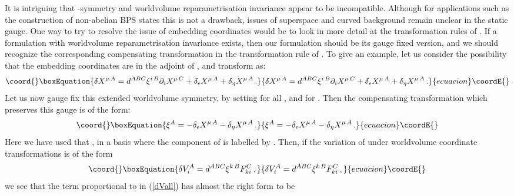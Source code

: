 \documentclass[12pt,a4paper]{article}
\begin{document}
It is intriguing that \myHighlight{$\kappa$}\coordHE{}-symmetry
and worldvolume reparametrisation invariance
appear to be incompatible. Although for
applications such as the construction of
non-abelian BPS states this is not a drawback,
issues of superspace and curved background remain unclear in the static
gauge. One way to try to resolve  the issue of embedding
coordinates would be to look in more detail at the transformation rules
of \coordHE{}. If a formulation with worldvolume reparametrisation
invariance exists, then our formulation should be its gauge fixed version,
and we should recognize the corresponding compensating transformation
in the transformation rule of \coordHE{}. To give an example, let us consider
the possibility that the embedding coordinates are in the adjoint of
\coordHE{}, and transform as:
\begin{equation}\coord{}\boxEquation{
   \delta X^{\mu\,A} = d^{ABC}\xi^{i\,B}\partial_i X^{\mu\,C}
            +\delta_\epsilon X^{\mu\,A} + \delta_\eta X^{\mu\,A}\,.
}{
   \delta X^{\mu\,A} = d^{ABC}\xi^{i\,B}\partial_i X^{\mu\,C}
            +\delta_\epsilon X^{\mu\,A} + \delta_\eta X^{\mu\,A}\,.
}{ecuacion}\coordE{}\end{equation}
Let us now gauge fix this extended worldvolume symmetry, by setting
\coordHE{} for all \coordHE{}, and \coordHE{}
for \coordHE{}. Then the compensating transformation which
preserves this gauge is of the form:
\begin{equation}\coord{}\boxEquation{
  \xi^A = -\delta_\epsilon X^{\mu\,A} - \delta_\eta X^{\mu\,A} \,.
}{
  \xi^A = -\delta_\epsilon X^{\mu\,A} - \delta_\eta X^{\mu\,A} \,.
}{ecuacion}\coordE{}\end{equation}
Here we have used that \coordHE{}, in a basis where the
\coordHE{} component of \coordHE{} is labelled by \coordHE{}.
Then, if the variation of \coordHE{} under worldvolume coordinate
transformations is of the form
\begin{equation}\coord{}\boxEquation{
    \delta V_i^A = d^{ABC}\xi^{k\, B} F_{ki}^C\,,
}{
    \delta V_i^A = d^{ABC}\xi^{k\, B} F_{ki}^C\,,
}{ecuacion}\coordE{}\end{equation}
we see that the term
proportional to \coordHE{} in (\ref{dVall}) has almost the right form to be
\end{document}
